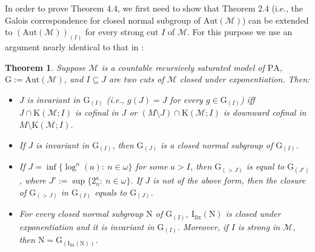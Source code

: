 \documentclass[11pt]{article}
\newtheorem{theorem}{Theorem}[section]
\theoremstyle{plain}
\theoremstyle{definition}
\newcommand{\M}{\mathcal{M}}
\newcommand{\I}{\mathrm{I_{fix}}}
\newcommand{\G}{\mathrm{G}}
\newcommand{\A}{\mathrm{Aut}}
\newcommand{\pa}{\mathrm{PA}}
\newcommand{\KK}{\mathrm{K}}
\begin{document}
In order to prove Theorem 4.4, we first need to show that Theorem 2.4 (i.e., the Galois correspondence for closed normal subgroup of $\A(\M)$) can be extended to $(\A(\M))_{(I)}$ for every strong  cut $I$ of $\M$. For this purpose we use an argument nearly identical to that in \cite{sch1}:
\begin{theorem}
	Suppose $\M$ is a countable recursively saturated model of $\pa$, $\G:=\A(\M)$, and $I\subseteq J$ are two cuts of $\M$ closed under exponentiation.  Then: 
	\begin{itemize}
	\item[(1)]$J$ is invariant in $\G_{(I)}$ (i.e., $g(J)=J$ for every $g\in\G_{(I)}$) iff $J\cap\KK(\M;I)$ is cofinal in $J$ or $(M\setminus J)\cap\KK(\M;I)$ is downward cofinal in $M\setminus\KK(\M;I)$.
	\item[(2)] If $J$ is   invariant  in $\G_{(I)}$, then $\G_{(J)}$ is a closed normal subgroup of $\G_{(I)}$.
	\item[(3)] If $J=\inf \{\log^{n}(a): \ n\in \omega\} $ for some $a>I$, then  $\G_{(>J)}$ is equal to $\G_{(J')} $, where $ J':=\sup \{2_{n}^{a}: \ n\in \omega\}$. If $J$ is not of the above form, then the closure of $\G_{(>J)}$ in $\G_{(I)}$ equals to $\G_{(J)} $.
	\item[(4)]  For every closed normal subgroup $\mathrm{N}$ of $\G_{(I)}$, $\I(\mathrm{N})$ is closed under exponentiation and it is invariant in $\G_{(I)}$. Moreover, if $I$ is strong in $\M$, then  $\mathrm{N}=\G_{(\I(\mathrm{N}))}$.
	\end{itemize}
\end{theorem} 
\end{document}
